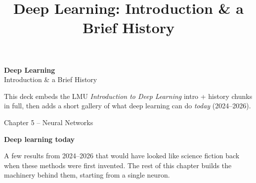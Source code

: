 \documentclass[aspectratio=43]{beamer}
\title{Deep Learning: Introduction \& a Brief History}
\date{}
\begin{document}
\begin{frame}[plain]
  \vfill
  \begin{center}
    {\Large\color{popblue}\textbf{Deep Learning}}\\[0.5em]
    {\large Introduction \& a Brief History}\\[1.2em]
    \begin{minipage}{0.86\textwidth}\centering\small
      This deck embeds the LMU \emph{Introduction to Deep Learning} intro + history
      chunks in full, then adds a short gallery of what deep learning can do \emph{today}
      (2024--2026).
    \end{minipage}
  \end{center}
  \vfill
  {\footnotesize\color{gray} Chapter 5 -- Neural Networks}
\end{frame}





\begin{frame}[plain]
  \vfill
  \begin{center}
    {\Large\color{popblue}\textbf{Deep learning today}}\\[0.9em]
    \begin{minipage}{0.84\textwidth}\centering\small
      A few results from 2024--2026 that would have looked like science fiction back when
      these methods were first invented. The rest of this chapter builds the machinery
      behind them, starting from a single neuron.
    \end{minipage}
  \end{center}
  \vfill
\end{frame}
\end{document}
